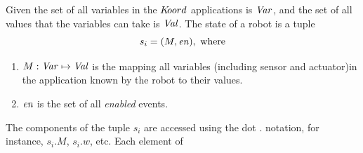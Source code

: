 \noindent
Given the set of all variables in the $K\kern-2pt oord$ applications is $\mathit{Var}$, and the set of all values that the variables can take is $\mathit{Val}$. The state of a robot is a tuple $$s_i = ( M,\mathit{en}), \mbox{ where}$$
\begin{enumerate}
\item ${M} : \mathit{Var} \mapsto \mathit{Val}$ is the mapping all variables (including sensor and actuator)in the application known by the robot to their values.
\item $\mathit{en}$ is the set of all \emph{enabled} events.
\end{enumerate}
The components of the tuple $s_i$ are accessed using the dot $.$ notation, for instance, $s_i.M$, $s_i.w$, etc. Each element of



%
%
%
%
